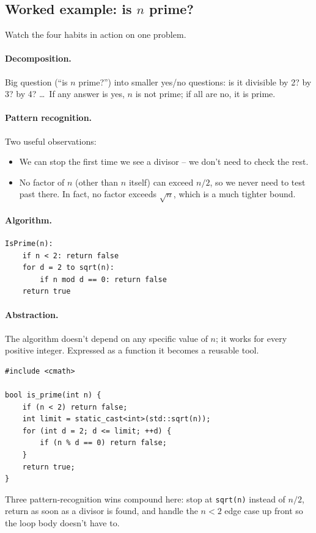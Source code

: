\documentclass[11pt]{article}
\begin{document}
\subsection{Worked example: is $n$ prime?}

Watch the four habits in action on one problem.

\paragraph{Decomposition.} Big question (``is $n$ prime?'') into
smaller yes/no questions: is it divisible by 2? by 3? by 4? \ldots\ If
any answer is yes, $n$ is not prime; if all are no, it is prime.

\paragraph{Pattern recognition.} Two useful observations:
\begin{itemize}[leftmargin=*,noitemsep]
    \item We can stop the first time we see a divisor -- we don't need
          to check the rest.
    \item No factor of $n$ (other than $n$ itself) can exceed $n/2$,
          so we never need to test past there. In fact, no factor
          exceeds $\sqrt{n}$, which is a much tighter bound.
\end{itemize}

\paragraph{Algorithm.}
\begin{verbatim}
IsPrime(n):
    if n < 2: return false
    for d = 2 to sqrt(n):
        if n mod d == 0: return false
    return true
\end{verbatim}

\paragraph{Abstraction.} The algorithm doesn't depend on any specific
value of $n$; it works for every positive integer. Expressed as a
function it becomes a reusable tool.

\begin{examplebox}[C++ translation]
\begin{verbatim}
#include <cmath>

bool is_prime(int n) {
    if (n < 2) return false;
    int limit = static_cast<int>(std::sqrt(n));
    for (int d = 2; d <= limit; ++d) {
        if (n % d == 0) return false;
    }
    return true;
}
\end{verbatim}
Three pattern-recognition wins compound here: stop at \texttt{sqrt(n)}
instead of $n/2$, return as soon as a divisor is found, and handle the
$n < 2$ edge case up front so the loop body doesn't have to.
\end{examplebox}
\end{document}

